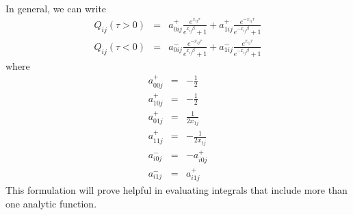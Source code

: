In general, we can write
\begin{eqnarray}
Q_{ij}(\tau > 0) & = &
a^+_{0 ij} \frac{e^{x_{ij} \tau}}
{e^{x_{ij}\beta} + 1} + 
a^+_{1 ij} \frac{e^{-x_{ij} \tau}}
{e^{-x_{ij}\beta} + 1} \\
Q_{ij}(\tau < 0) & = &
a^-_{0 ij} \frac{e^{-x_{ij} \tau}}
{e^{x_{ij}\beta} + 1} + 
a^-_{1 ij} \frac{e^{x_{ij} \tau}}
{e^{-x_{ij}\beta} + 1} 
\end{eqnarray}
where
\begin{eqnarray}
a^+_{00j} & = & -\frac{1}{2} \\
a^+_{10j} & = & -\frac{1}{2} \\
a^+_{01j} & = & \frac{1}{2 x_{1j}} \\
a^+_{11j} & = & -\frac{1}{2 x_{1j}} \\
a^-_{i0j} & = & -a^{+}_{i0j} \\
a^-_{i1j} & = & a^{+}_{i1j}
\end{eqnarray}
This formulation will prove helpful in evaluating
integrals that include more than one analytic function.





